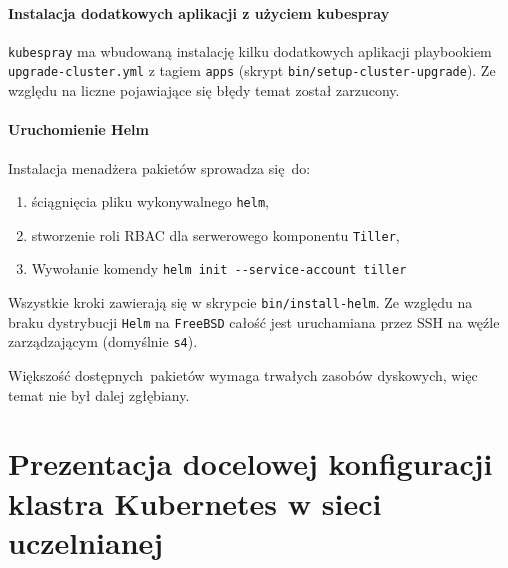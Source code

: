 \documentclass[a4paper,12pt,twoside,openany]{report}
\providecommand{\tightlist}{%
  \setlength{\itemsep}{0pt}\setlength{\parskip}{0pt}}
\newcommand{\passthrough}[1]{#1}
\begin{document}
\hypertarget{instalacja-dodatkowych-aplikacji-z-uux17cyciem-kubespray}{%
\subsubsection{Instalacja dodatkowych aplikacji z użyciem
kubespray}\label{instalacja-dodatkowych-aplikacji-z-uux17cyciem-kubespray}}

\passthrough{\lstinline!kubespray!} ma wbudowaną instalację kilku
dodatkowych aplikacji playbookiem
\passthrough{\lstinline!upgrade-cluster.yml!} z tagiem
\passthrough{\lstinline!apps!} (skrypt
\passthrough{\lstinline!bin/setup-cluster-upgrade!}). Ze względu na
liczne pojawiające się błędy temat został zarzucony.

\hypertarget{uruchomienie-helm}{%
\subsubsection{Uruchomienie Helm}\label{uruchomienie-helm}}

Instalacja menadżera pakietów sprowadza się~do:

\begin{enumerate}
\def\labelenumi{\arabic{enumi}.}
\tightlist
\item
  ściągnięcia pliku wykonywalnego \passthrough{\lstinline!helm!},
\item
  stworzenie roli RBAC dla serwerowego komponentu
  \passthrough{\lstinline!Tiller!},
\item
  Wywołanie komendy
  \passthrough{\lstinline!helm init --service-account tiller!}
\end{enumerate}

Wszystkie kroki zawierają się w skrypcie
\passthrough{\lstinline!bin/install-helm!}. Ze względu na braku
dystrybucji \passthrough{\lstinline!Helm!} na
\passthrough{\lstinline!FreeBSD!} całość jest uruchamiana przez SSH na
węźle zarządzającym (domyślnie \passthrough{\lstinline!s4!}).

Większość dostępnych~pakietów wymaga trwałych zasobów dyskowych, więc
temat nie był dalej zgłębiany.

\hypertarget{prezentacja-docelowej-konfiguracji-klastra-kubernetes-w-sieci-uczelnianej}{%
\chapter{Prezentacja docelowej konfiguracji klastra Kubernetes w sieci
uczelnianej}\label{prezentacja-docelowej-konfiguracji-klastra-kubernetes-w-sieci-uczelnianej}}
\end{document}
